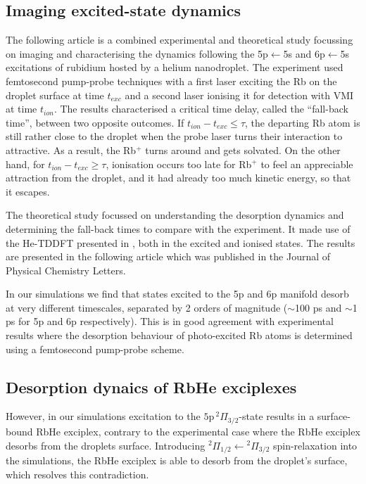 	\subsection*{Imaging excited-state dynamics}	
		The following article is a combined experimental and theoretical study focussing on imaging and characterising the dynamics following the 5p$\leftarrow$5s and 6p$\leftarrow$5s excitations of rubidium hosted by a helium nanodroplet. The experiment used femtosecond pump-probe techniques with a first laser exciting the Rb on the droplet surface at time $t_{exc}$ and a second laser ionising it for detection with VMI at time $t_{ion}$. The results characterised a critical time delay, called the ``fall-back time'', between two opposite outcomes. If $t_{ion}-t_{exc}\leq\tau$, the departing Rb atom is still rather close to the droplet when the probe laser turns their interaction to attractive. As a result, the Rb$^+$ turns around and gets solvated. On the other hand, for $t_{ion}-t_{exc}\geq\tau$, ionisation occurs too late for Rb$^+$ to feel an appreciable attraction from the droplet, and it had already too much kinetic energy, so that it escapes. 
	
		The theoretical study focussed on understanding the desorption dynamics and determining the fall-back times to compare with the experiment. It made use of the He-TDDFT presented in , both in the excited and ionised states. The results are presented in the following article which was published in the Journal of Physical Chemistry Letters\citep{Vangerow2017}.
		
		In our simulations we find that states excited to the 5p and 6p manifold desorb at very different timescales, separated by 2 orders of magnitude ($\sim$100 ps and $\sim$1 ps for 5p and 6p respectively). This is in good agreement with experimental results where the desorption behaviour of photo-excited Rb atoms is determined using a femtosecond pump-probe scheme. 

	\subsection*{Desorption dynaics of RbHe exciplexes}
		However, in our simulations excitation to the $5\mathrm{p}\,^2\Pi_{3/2}$-state results in a surface-bound RbHe exciplex, contrary to the experimental case where the RbHe exciplex desorbs from the droplets surface. Introducing $^2\Pi_{1/2}\leftarrow{^2}\Pi_{3/2}$ spin-relaxation into the simulations, the RbHe exciplex is able to desorb from the droplet's surface, which resolves this contradiction.
		
